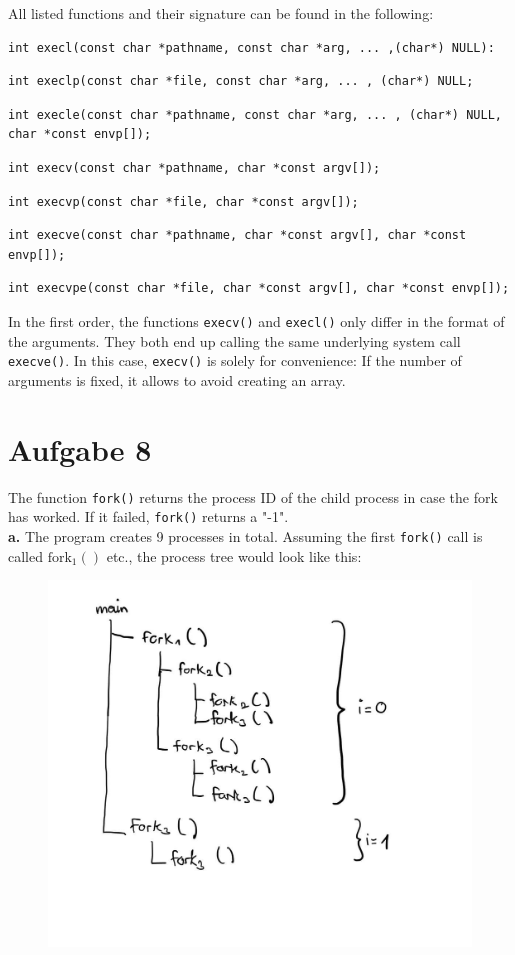 \documentclass{article}
\begin{document}
All listed functions and their signature can be found in the following:
\begin{lstlisting}
int execl(const char *pathname, const char *arg, ... ,(char*) NULL):
\end{lstlisting}
\begin{lstlisting}
int execlp(const char *file, const char *arg, ... , (char*) NULL;
\end{lstlisting}
\begin{lstlisting}
int execle(const char *pathname, const char *arg, ... , (char*) NULL, char *const envp[]);
\end{lstlisting}
\begin{lstlisting}
int execv(const char *pathname, char *const argv[]);
\end{lstlisting}
\begin{lstlisting}
int execvp(const char *file, char *const argv[]);
\end{lstlisting}
\begin{lstlisting}
int execve(const char *pathname, char *const argv[], char *const envp[]);
\end{lstlisting}
\begin{lstlisting}
int execvpe(const char *file, char *const argv[], char *const envp[]);
\end{lstlisting}

In the first order, the functions \texttt{execv()} and \texttt{execl()} only
differ in the format of the arguments. They both end up calling the same
underlying system call \texttt{execve()}. In this case, \texttt{execv()} is
solely for convenience: If the number of arguments is fixed, it allows
to avoid creating an array.

\section*{Aufgabe 8}
The function \texttt{fork()} returns the process ID of the child process
in case the fork has worked. If it failed, \texttt{fork()} returns a "-1".\\

\textbf{a.} The program creates 9 processes in total. Assuming the first
\texttt{fork()} call is called \( \text{fork} _{1} () \) etc., the process
tree would look like this:
\begin{figure}[H]
    \centering
    \includegraphics[width=.5\textwidth]{ProcessTree.jpg}
\end{figure}
\end{document}
